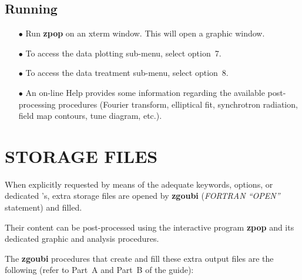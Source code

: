 \subsection{Running \zpop} 

\begin{itemize}
\item[$\bullet$] Run \textbf{zpop} on an xterm window. This will open a 
graphic window. 
\item[$\bullet$] To access the data plotting sub-menu, select option~7. 
\item[$\bullet$] To access the data treatment sub-menu, select option~8. 
\item[$\bullet$] An on-line Help provides some information 
regarding the available post-processing procedures (Fourier transform, elliptical fit, synchrotron 
radiation, field map contours, tune diagram, etc.).
\end{itemize}

\section{STORAGE FILES} \label{secD-3}

When explicitly requested by means of the adequate keywords,  options, or dedicated 
\LABEL's, extra storage files are opened by \textbf{zgoubi} 
(\textsl{FORTRAN ``OPEN''} statement) and filled. 

\medskip

\noindent Their content can be    post-processed using the interactive program \textbf{zpop} and its dedicated graphic 
and analysis procedures. 

\bigskip

\noindent The \textbf{zgoubi} procedures that create and fill these extra output 
files are the following (refer to Part~A and Part~B of the 
guide):


